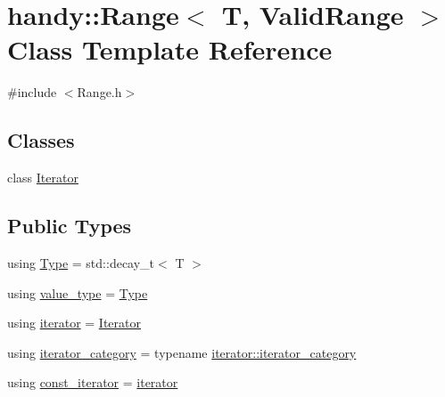 \hypertarget{classhandy_1_1Range}{}\section{handy\+:\+:Range$<$ T, Valid\+Range $>$ Class Template Reference}
\label{classhandy_1_1Range}


{\ttfamily \#include $<$Range.\+h$>$}

\subsection*{Classes}
\begin{DoxyCompactItemize}
\item 
class \hyperlink{classhandy_1_1Range_1_1Iterator}{Iterator}
\end{DoxyCompactItemize}
\subsection*{Public Types}
\begin{DoxyCompactItemize}
\item 
using \hyperlink{classhandy_1_1Range_a2a8c2d169657c93464989e7608ed3f9b}{Type} = std\+::decay\+\_\+t$<$ T $>$
\item 
using \hyperlink{classhandy_1_1Range_ab2b8b141ea04ed06e53938c899b5fa8a}{value\+\_\+type} = \hyperlink{classhandy_1_1Range_a2a8c2d169657c93464989e7608ed3f9b}{Type}
\item 
using \hyperlink{classhandy_1_1Range_ad879bbe314ce7bcffdda15a0f065e0f8}{iterator} = \hyperlink{classhandy_1_1Range_1_1Iterator}{Iterator}
\item 
using \hyperlink{classhandy_1_1Range_a9d4a18bcffddb19f6dcc2d9088fd5219}{iterator\+\_\+category} = typename \hyperlink{classhandy_1_1Range_1_1Iterator_a5e9da733ea7dadc2cc69327288e3e7a2}{iterator\+::iterator\+\_\+category}
\item 
using \hyperlink{classhandy_1_1Range_a776521ae1ca6a10d1be256ecdf26f6e2}{const\+\_\+iterator} = \hyperlink{classhandy_1_1Range_ad879bbe314ce7bcffdda15a0f065e0f8}{iterator}
\end{DoxyCompactItemize}
